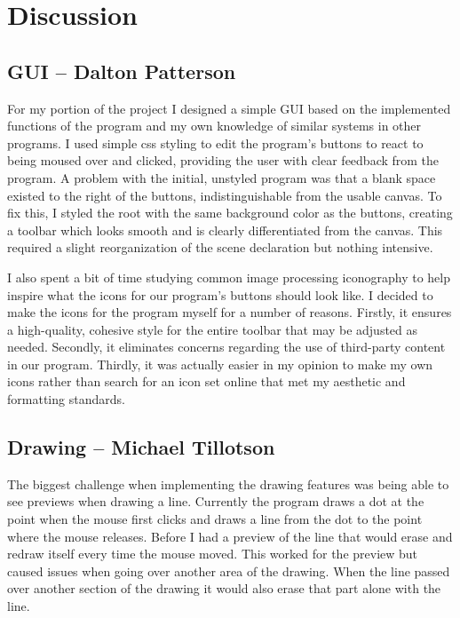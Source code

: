 \documentclass[10 pt]{scrartcl}
\begin{document}
\section{Discussion}

\subsection{GUI -- Dalton Patterson}

For my portion of the project I designed a simple GUI based on the implemented functions of the program and my own knowledge of similar systems in other programs.  I used simple css styling to edit the program's buttons to react to being moused over and clicked, providing the user with clear feedback from the program.  A problem with the initial, unstyled program was that a blank space existed to the right of the buttons, indistinguishable from the usable canvas.  To fix this, I styled the root with the same background color as the buttons, creating a toolbar which looks smooth and is clearly differentiated from the canvas.  This required a slight reorganization of the scene declaration but nothing intensive.

I also spent a bit of time studying common image processing iconography to help inspire what the icons for our program's buttons should look like.  I decided to make the icons for the program myself for a number of reasons.  Firstly, it ensures a high-quality, cohesive style for the entire toolbar that may be adjusted as needed.  Secondly, it eliminates concerns regarding the use of third-party content in our program.  Thirdly, it was actually easier in my opinion to make my own icons rather than search for an icon set online that met my aesthetic and formatting standards.

\subsection{Drawing -- Michael Tillotson}

The biggest challenge when implementing the drawing features was being able to see previews when drawing a line. Currently the program draws a dot at the point when the mouse first clicks and draws a line from the dot to the point where the mouse releases. Before I had a preview of the line that would erase and redraw itself every time the mouse moved. This worked for the preview but caused issues when going over another area of the drawing. When the line passed over another section of the drawing it would also erase that part alone with the line.
\end{document}
